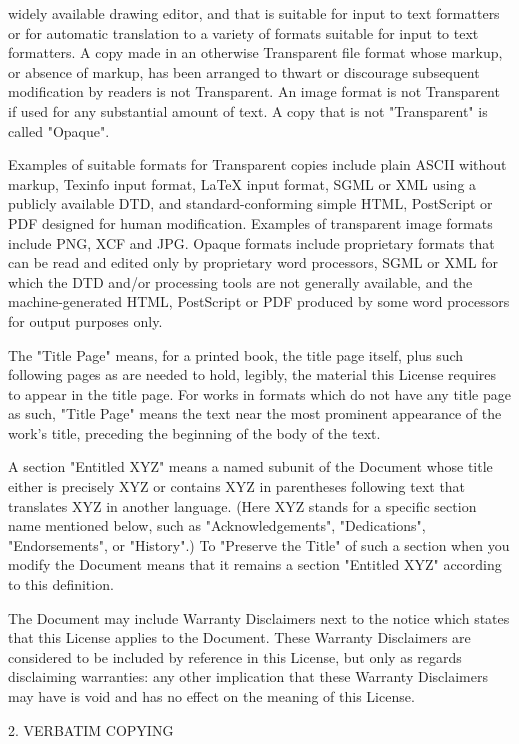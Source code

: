 \documentclass{article}
\begin{document}
widely available drawing editor, and that is suitable for input to text formatters or for automatic translation to a variety of formats suitable for input to text formatters. A copy made in an otherwise Transparent file format whose markup, or absence of markup, has been arranged to thwart or discourage subsequent modification by readers is not Transparent. An image format is not Transparent if used for any substantial amount of text. A copy that is not "Transparent" is called "Opaque". 

Examples of suitable formats for Transparent copies include plain ASCII without markup, Texinfo input format, LaTeX input format, SGML or XML using a publicly available DTD, and standard-conforming simple HTML, PostScript or PDF designed for human modification.  Examples of transparent image formats include PNG, XCF and JPG. Opaque formats include proprietary formats that can be read and edited only by proprietary word processors, SGML or XML for which the DTD and/or processing tools are not generally available, and the machine-generated HTML, PostScript or PDF produced by some word processors for output purposes only. 

The "Title Page" means, for a printed book, the title page itself, plus such following pages as are needed to hold, legibly, the material this License requires to appear in the title page. For works in formats which do not have any title page as such, "Title Page" means the text near the most prominent appearance of the work's title, preceding the beginning of the body of the text. 

A section "Entitled XYZ" means a named subunit of the Document whose title either is precisely XYZ or contains XYZ in parentheses following text that translates XYZ in another language. (Here XYZ stands for a specific section name mentioned below, such as "Acknowledgements", "Dedications", "Endorsements", or "History".)  To "Preserve the Title" of such a section when you modify the Document means that it remains a section "Entitled XYZ" according to this definition. 

The Document may include Warranty Disclaimers next to the notice which states that this License applies to the Document. These Warranty Disclaimers are considered to be included by reference in this License, but only as regards disclaiming warranties: any other implication that these Warranty Disclaimers may have is void and has no effect on the meaning of this License. 

2. VERBATIM COPYING 
\end{document}
